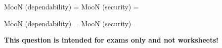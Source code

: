 \vskip 10pt

MooN (dependability) = \underbar{\hskip 50pt}  \hskip 70pt MooN (security) = \underbar{\hskip 50pt}







MooN (dependability) =   \hskip 70pt MooN (security) = 







{\bf This question is intended for exams only and not worksheets!}



